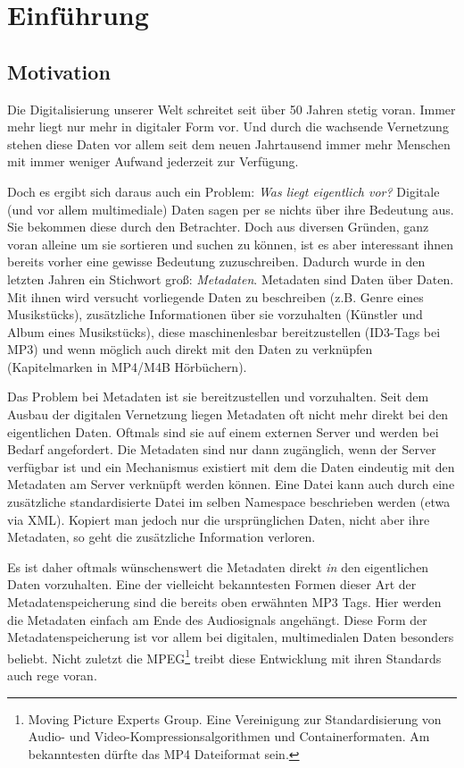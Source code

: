 \chapter{Einf\"uhrung}
\label{ch:intro}

\section{Motivation}

Die Digitalisierung unserer Welt schreitet seit über 50 Jahren stetig voran. Immer mehr liegt nur mehr in digitaler Form vor. Und durch die wachsende Vernetzung stehen diese Daten vor allem seit dem neuen Jahrtausend immer mehr Menschen mit immer weniger Aufwand jederzeit zur Verfügung. 

Doch es ergibt sich daraus auch ein Problem: \textit{Was liegt eigentlich vor?} Digitale (und vor allem multimediale) Daten sagen per se nichts über ihre Bedeutung aus. Sie bekommen diese durch den Betrachter. Doch aus diversen Gründen, ganz voran alleine um sie sortieren und suchen zu können, ist es aber interessant ihnen bereits vorher eine gewisse Bedeutung zuzuschreiben. Dadurch wurde in den letzten Jahren ein Stichwort groß: \textit{Metadaten}. Metadaten sind \glqq{}Daten über Daten\grqq{}. Mit ihnen wird versucht vorliegende Daten zu beschreiben (z.B. Genre eines Musikstücks), zusätzliche Informationen über sie vorzuhalten (Künstler und Album eines Musikstücks), diese maschinenlesbar bereitzustellen (ID3-Tags bei MP3) und wenn möglich auch direkt mit den Daten zu verknüpfen (Kapitelmarken in MP4/M4B Hörbüchern).

Das Problem bei Metadaten ist sie bereitzustellen und vorzuhalten. Seit dem Ausbau der digitalen Vernetzung liegen Metadaten oft nicht mehr direkt bei den eigentlichen Daten. Oftmals sind sie auf einem externen Server und werden bei Bedarf angefordert. Die Metadaten sind nur dann zugänglich, wenn der Server verfügbar ist und ein Mechanismus existiert mit dem die Daten eindeutig mit den Metadaten am Server verknüpft werden können. 
Eine Datei kann auch durch eine zusätzliche standardisierte Datei im selben Namespace beschrieben werden (etwa via XML). Kopiert man jedoch nur die ursprünglichen Daten, nicht aber ihre Metadaten, so geht die zusätzliche Information verloren. 

Es ist daher oftmals wünschenswert die Metadaten direkt \textit{in} den eigentlichen Daten vorzuhalten. Eine der vielleicht bekanntesten Formen dieser Art der Metadatenspeicherung sind die bereits oben erwähnten MP3 Tags. Hier werden die Metadaten einfach am Ende des Audiosignals angehängt. Diese Form der Metadatenspeicherung ist vor allem bei digitalen, multimedialen Daten besonders beliebt. Nicht zuletzt die MPEG\footnote{Moving Picture Experts Group. Eine Vereinigung zur Standardisierung von Audio- und Video-Kompressionsalgorithmen und Containerformaten. Am bekanntesten dürfte das MP4 Dateiformat sein.} treibt diese Entwicklung mit ihren Standards auch rege voran. 

